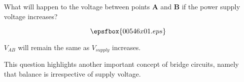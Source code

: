 

What will happen to the voltage between points {\bf A} and {\bf B} if the power supply voltage increases?

$$\epsfbox{00546x01.eps}$$







$V_{AB}$ will remain the same as $V_{supply}$ increases.







This question highlights another important concept of bridge circuits, namely that balance is irrespective of supply voltage.




